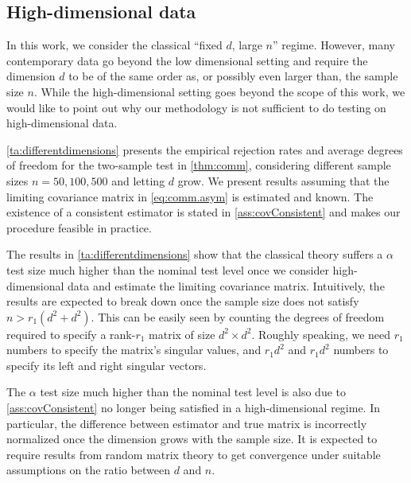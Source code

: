 \documentclass[12pt]{article}
\numberwithin{equation}{section}
\numberwithin{table}{section}
\numberwithin{thm}{section}
\numberwithin{defn}{section}
\numberwithin{lem}{section}
\numberwithin{prop}{section}
\numberwithin{cor}{section}
\numberwithin{rem}{section}
\begin{document}
\subsection{High-dimensional data} \label{se:compl3}

In this work, we consider the classical ``fixed $d$, large $n$” regime. However, many contemporary data go beyond the low dimensional setting and require the dimension $d$ to be of the same order as, or possibly even larger than, the sample size $n$.
While the high-dimensional setting goes beyond the scope of this work, we would like to point out why our methodology is not sufficient to do testing on high-dimensional data.

\autoref{ta:differentdimensions} presents the empirical rejection rates and average degrees of freedom for the two-sample test in \autoref{thm:comm}, considering different sample sizes $n=50, 100, 500$ and letting $d$ grow. We present results assuming that the limiting covariance matrix in \autoref{eq:comm.asym} is estimated and known. The existence of a consistent estimator is stated in \autoref{ass:covConsistent} and makes our procedure feasible in practice.

The results in \autoref{ta:differentdimensions} show that the classical theory suffers a $\alpha$ test size much higher than the nominal test level once we consider high-dimensional data and estimate the limiting covariance matrix. Intuitively, the results are expected to break down once the sample size does not satisfy $n > r_{1}(d^2 + d^2)$. This can be easily seen by counting the degrees of freedom required to specify a rank-$r_{1}$ matrix of size $d^2 \times d^2$. Roughly speaking, we need $r_{1}$ numbers to specify the matrix's singular values, and $r_{1}d^2$ and $r_{1}d^2$ numbers to specify its left and right singular vectors.

The $\alpha$ test size much higher than the nominal test level is also due to \autoref{ass:covConsistent} no longer being satisfied in a high-dimensional regime. In particular, the difference between estimator and true matrix is incorrectly normalized once the dimension grows with the sample size. It is expected to require results from random matrix theory to get convergence under suitable assumptions on the ratio between $d$ and $n$. 
\end{document}
